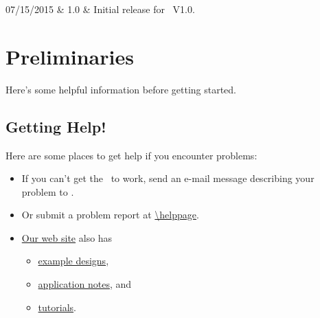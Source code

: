 \documentclass[letterpaper,11pt,oneside]{memoir}
\newcommand{\copyrightyear}{2015}
\begin{document}
\frontmatter


\makexesslegal{\copyrightyear}

\begin{xessrevisiontbl}
	07/15/2015 & 1.0 & Initial release for \product\ V1.0.\\
\end{xessrevisiontbl}

\makexesstoc

\mainmatter



\chapter{Preliminaries}

Here's some helpful information before getting started.


\section{Getting Help!}

Here are some places to get help if you encounter problems:

\begin{itemize}
\item If you can't get the \product\ to work, send an e-mail message
	describing your problem to \href{mailto:\helpemail}{\helpemail}. 
\item Or submit a problem report at	\url{\helppage}.
\item \href{http://www.xess.com}{Our web site} also has
	\begin{itemize}
	\item \href{http://www.xess.com/projects/}{example designs}, 
	\item \href{http://www.xess.com/appnotes/}{application notes}, and
	\item \href{http://www.xess.com/tutorials/}{tutorials}.
	\end{itemize}
\end{itemize}


\end{document}

